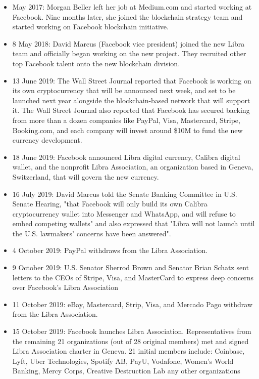 \begin{itemize}
    \item May 2017: Morgan Beller left her job at Medium.com and started working at Facebook. Nine months later, she joined the blockchain strategy team and started working on Facebook blockchain initiative.
    \item 8 May 2018: David Marcus (Facebook vice president) joined the new Libra team and officially began working on the new project. They recruited other top Facebook talent onto the new blockchain division.
    \item 13 June 2019: The Wall Street Journal reported that Facebook is working on its own cryptocurrency that will be announced next week, and set to be launched next year alongside the blockchain-based network that will support it. The Wall Street Journal also reported that Facebook has secured backing from more than a dozen companies like PayPal, Visa, Mastercard, Stripe, Booking.com, and each company will invest around \$10M to fund the new currency development.
    \item 18 June 2019: Facebook announced Libra digital currency, Calibra digital wallet, and the nonprofit Libra Association, an organization based in Geneva, Switzerland, that will govern the new currency.
    \item 16 July 2019: David Marcus told the Senate Banking Committee in U.S. Senate Hearing, "that Facebook will only build its own Calibra cryptocurrency wallet into Messenger and WhatsApp, and will refuse to embed competing wallets" and also expressed that "Libra will not launch until the U.S. lawmakers' concerns have been answered".
    \item 4 October 2019: PayPal withdraws from the Libra Association.
    \item 9 October 2019: U.S. Senator Sherrod Brown and Senator Brian Schatz sent letters to the CEOs of Stripe, Visa, and MasterCard to express deep concerns over Facebook's Libra Association
    \item 11 October 2019: eBay, Mastercard, Strip, Visa, and Mercado Pago withdraw from the Libra Association.
    \item 15 October 2019: Facebook launches Libra Association. Representatives from the remaining 21 organizations (out of 28 original members) met and signed Libra Association charter in Geneva. 21 initial members include: Coinbase, Lyft, Uber Technologies, Spotify AB, PayU, Vodafone, Women's World Banking, Mercy Corps, Creative Destruction Lab any other organizations
\end{itemize}

